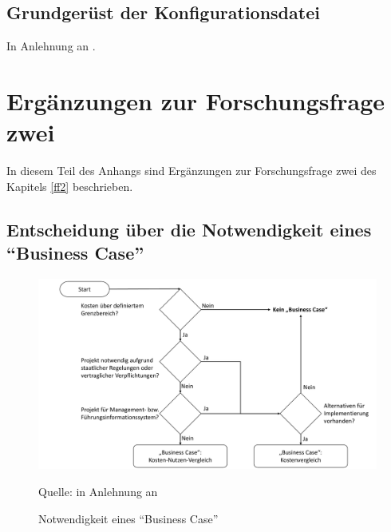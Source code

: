 \section{Grundgerüst der Konfigurationsdatei}

In Anlehnung an \cite[][Application\,$\rightarrow$\,Deployments]{red_hat_inc_okd_2019}.

\par

 

%


\chapter{Ergänzungen zur Forschungsfrage zwei} \label{appendixFF2}
In diesem Teil des Anhangs sind Ergänzungen zur Forschungsfrage zwei des Kapitels \vref{ff2} beschrieben.

\section{Entscheidung über die Notwendigkeit eines \enquote{Business Case}}

\begin{figure}[H]
	\centering
	\includegraphics[scale=0.48]{img/entscheidungBC.pdf}
	\caption{Notwendigkeit eines \enquote{Business Case}}
	{\footnotesize Quelle: in Anlehnung an \cite[][S.\,29]{brugger_it_2009}}
	\label{abb:entscheidungBC}
\end{figure}

